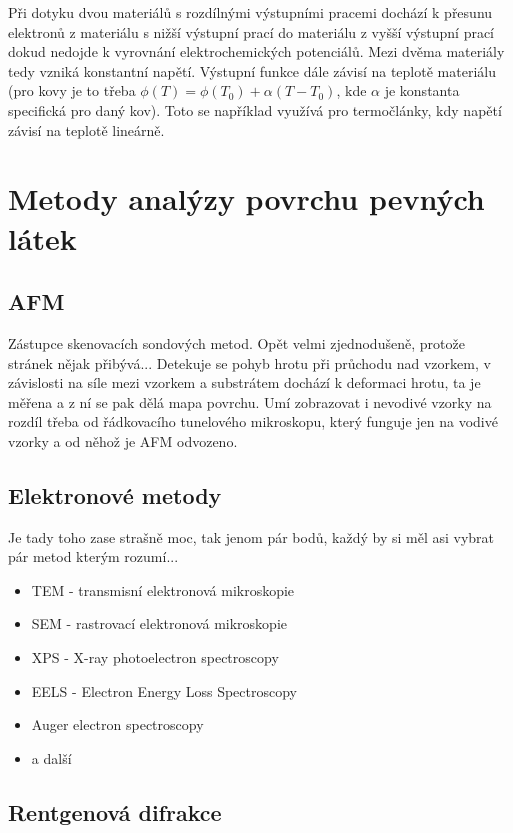 \documentclass[12pt]{article}
\begin{document}
Při dotyku dvou materiálů s rozdílnými výstupními pracemi dochází k přesunu elektronů z materiálu s nižší výstupní prací do materiálu z vyšší výstupní prací dokud nedojde k vyrovnání elektrochemických potenciálů. Mezi dvěma materiály tedy vzniká konstantní napětí. Výstupní funkce dále závisí na teplotě materiálu (pro kovy je to třeba $\phi(T) = \phi(T_0) + \alpha(T-T_0)$, kde $\alpha$ je konstanta specifická pro daný kov). Toto se například využívá pro termočlánky, kdy napětí závisí na teplotě lineárně. 


\section{Metody analýzy povrchu pevných látek}


\subsection{AFM}
Zástupce skenovacích sondových metod. Opět velmi zjednodušeně, protože stránek nějak přibývá...  Detekuje se pohyb hrotu při průchodu nad vzorkem, v závislosti na síle mezi vzorkem a substrátem dochází k deformaci hrotu, ta je měřena a z ní se pak dělá mapa povrchu. Umí zobrazovat i nevodivé vzorky na rozdíl třeba od řádkovacího tunelového mikroskopu, který funguje jen na vodivé vzorky a od něhož je AFM odvozeno. 

\subsection{Elektronové metody}
Je tady toho zase strašně moc, tak jenom pár bodů, každý by si měl asi vybrat pár metod kterým rozumí...

\begin{itemize} 
\item TEM - transmisní elektronová mikroskopie
\item SEM -  rastrovací elektronová mikroskopie
\item XPS - X-ray photoelectron spectroscopy
\item EELS - Electron Energy Loss Spectroscopy
\item Auger electron spectroscopy
\item a další 
\end{itemize}

\subsection{Rentgenová difrakce}
\end{document}
